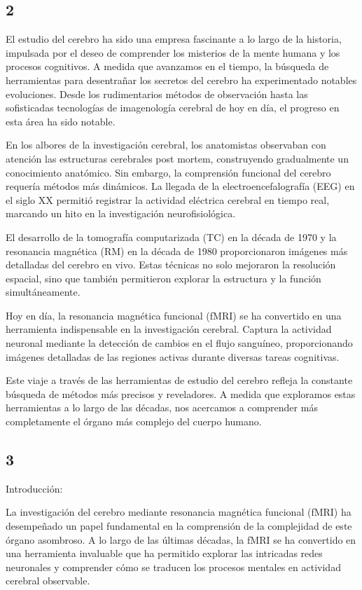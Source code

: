 \documentclass{article}
\begin{document}
	\subsection{2}
	
	El estudio del cerebro ha sido una empresa fascinante a lo largo de la historia, impulsada por el deseo de comprender los misterios de la mente humana y los procesos cognitivos. A medida que avanzamos en el tiempo, la búsqueda de herramientas para desentrañar los secretos del cerebro ha experimentado notables evoluciones. Desde los rudimentarios métodos de observación hasta las sofisticadas tecnologías de imagenología cerebral de hoy en día, el progreso en esta área ha sido notable.
	
	En los albores de la investigación cerebral, los anatomistas observaban con atención las estructuras cerebrales post mortem, construyendo gradualmente un conocimiento anatómico. Sin embargo, la comprensión funcional del cerebro requería métodos más dinámicos. La llegada de la electroencefalografía (EEG) en el siglo XX permitió registrar la actividad eléctrica cerebral en tiempo real, marcando un hito en la investigación neurofisiológica.
	
	El desarrollo de la tomografía computarizada (TC) en la década de 1970 y la resonancia magnética (RM) en la década de 1980 proporcionaron imágenes más detalladas del cerebro en vivo. Estas técnicas no solo mejoraron la resolución espacial, sino que también permitieron explorar la estructura y la función simultáneamente.
	
	Hoy en día, la resonancia magnética funcional (fMRI) se ha convertido en una herramienta indispensable en la investigación cerebral. Captura la actividad neuronal mediante la detección de cambios en el flujo sanguíneo, proporcionando imágenes detalladas de las regiones activas durante diversas tareas cognitivas.
	
	Este viaje a través de las herramientas de estudio del cerebro refleja la constante búsqueda de métodos más precisos y reveladores. A medida que exploramos estas herramientas a lo largo de las décadas, nos acercamos a comprender más completamente el órgano más complejo del cuerpo humano.
	
	\subsection{3}
	Introducción:
	
	La investigación del cerebro mediante resonancia magnética funcional (fMRI) ha desempeñado un papel fundamental en la comprensión de la complejidad de este órgano asombroso. A lo largo de las últimas décadas, la fMRI se ha convertido en una herramienta invaluable que ha permitido explorar las intricadas redes neuronales y comprender cómo se traducen los procesos mentales en actividad cerebral observable.
	
\end{document}
